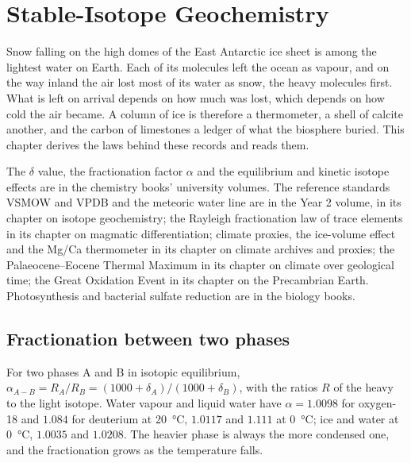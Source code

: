 \chapter{Stable-Isotope Geochemistry}\label{ch:b3:stable-isotopes}

Snow falling on the high domes of the East Antarctic ice sheet is among the
lightest water on Earth. Each of its molecules left the ocean as vapour, and
on the way inland the air lost most of its water as snow, the heavy molecules
first. What is left on arrival depends on how much was lost, which depends on
how cold the air became. A column of ice is therefore a thermometer, a shell
of calcite another, and the carbon of limestones a ledger of what the
biosphere buried. This chapter derives the laws behind these records and
reads them.

\begin{recall}
The $\delta$ value, the fractionation factor $\alpha$ and the equilibrium and
kinetic isotope effects are in the chemistry books' university volumes. The
reference standards VSMOW and VPDB and the meteoric water line are in the
Year 2 volume, in its chapter on isotope geochemistry; the Rayleigh
fractionation law of trace elements in its chapter on magmatic
differentiation; climate proxies, the ice-volume effect and the Mg/Ca
thermometer in its chapter on climate archives and proxies; the
Palaeocene--Eocene Thermal Maximum in its chapter on climate over geological
time; the Great Oxidation Event in its chapter on the Precambrian Earth.
Photosynthesis and bacterial sulfate reduction are in the biology books.
\end{recall}

\section{Fractionation between two phases}\label{sec:b3:stable-isotopes:fractionation}

For two phases A and B in isotopic equilibrium, $\alpha_{A-B} = R_A/R_B =
(1000 + \delta_A)/(1000 + \delta_B)$, with the ratios $R$ of the heavy to the
light isotope. Water vapour and liquid water have $\alpha = 1.0098$ for oxygen-18
and $1.084$ for deuterium at \qty{20}{\celsius}, $1.0117$ and $1.111$ at
\qty{0}{\celsius}; ice and water at \qty{0}{\celsius}, $1.0035$ and $1.0208$.
The heavier phase is always the more condensed one, and the fractionation
grows as the temperature falls.

